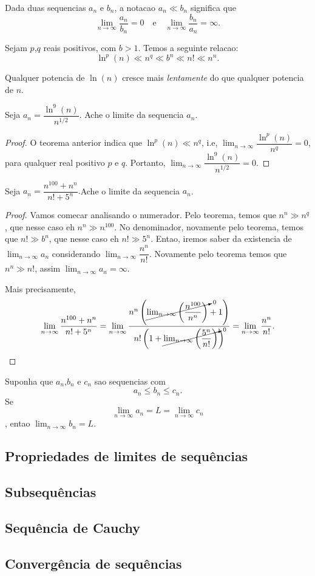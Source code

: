       \begin{definition}
         Dada duas sequencias ${a_{n}}$ e ${b_{n}}$, a notacao $a_{n} \ll b_{n}$ significa que
         $$\lim_{n\to\infty}\dfrac{a_{n}}{b_{n}} = 0\quad\textrm{e}\quad \lim_{n\to\infty}\dfrac{b_{n}}{a_{n}} = \infty.$$
      \end{definition}
      \begin{theorem}
         Sejam $p$,$q$ reais positivos, com $b>1$. Temos a seguinte relacao:
         $$\ln^{p}(n) \ll n^{q} \ll b^{n} \ll n! \ll n^{n}.$$
      \end{theorem}
      Qualquer potencia de $\ln(n)$ cresce mais \emph{lentamente} do que qualquer potencia de $n$.
      \begin{exmp}
         Seja $a_{n} = \dfrac{\ln^{9}(n)}{n^{1/2}}$. Ache o limite da sequencia $a_{n}$.
         \begin{proof}
            O teorema anterior indica que $\ln^{p}(n) \ll n^{q}$, i.e, $\lim_{n\to\infty}\dfrac{\ln^{p}(n)}{n^{q}} = 0$, para qualquer real positivo $p$ e $q$. Portanto, $\lim_{n\to\infty}\dfrac{\ln^{9}(n)}{n^{1/2}} = 0.$
         \end{proof}
      \end{exmp}
      \begin{exmp}
         Seja $a_{n} = \dfrac{n^{100}+n^{n}}{n!+5^{n}}.$Ache o limite da sequencia $a_{n}$.
         \begin{proof}
            Vamos comecar analisando o numerador. Pelo teorema, temos que $n^{n} \gg n^{q}$, que nesse caso eh $n^{n} \gg n^{100}$. No denominador, novamente pelo teorema, temos que $n! \gg b^{n}$, que nesse caso eh $n! \gg 5^{n}$. Entao, iremos saber da existencia de $\lim_{n\to\infty}a_{n}$ considerando $\lim_{n\to\infty} \dfrac{n^{n}}{n!}.$
            Novamente pelo teorema temos que $n^{n} \gg n!$, assim $\lim_{n\to\infty} a_{n} = \infty.$
            
            Mais precisamente, 
            $$\lim_{n\to\infty}\dfrac{n^{100}+n^{n}}{n!+5^{n}} = \lim_{n\to\infty}\dfrac{n^{n}\left(\cancelto{0}{\lim_{n\to\infty}\left(\dfrac{n^{100}}{n^{n}}\right)}+1\right)}{n!\left(1+\cancelto{0}{\lim_{n\to\infty}\left(\dfrac{5^{n}}{n!}\right)}\right)} = \lim_{n\to\infty} \dfrac{n^{n}}{n!}.$$
         \end{proof}
      \end{exmp}
      \begin{theorem}
         Suponha que $a_{n}$,$b_{n}$ e $c_{n}$ sao sequencias com $$a_{n} \leq b_{n} \leq c_{n}.$$ Se $$\lim_{n\to\infty}a_{n} = L = \lim_{n\to\infty}c_{n}$$, entao $\lim_{n\to\infty}b_{n} = L.$
      \end{theorem}

   \subsection{Propriedades de limites de sequências}
   \subsection{Subsequências}
   \subsection{Sequência de Cauchy}

   \subsection{Convergência de sequências}
